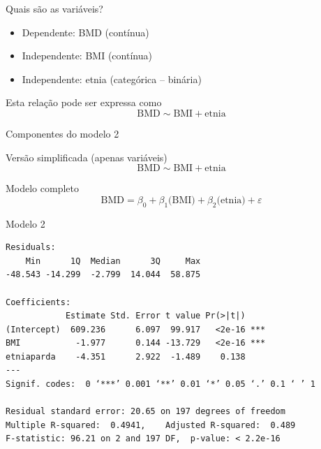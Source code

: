 \documentclass{beamer}
\begin{document}
\begin{frame}{\scriptsize Quais são as variáveis?}
  \begin{itemize}
    \footnotesize
  \item Dependente: BMD (contínua)
  \item Independente: BMI (contínua)
  \item Independente: etnia (categórica -- binária)
  \end{itemize}
  \vfill
  \begin{block}{Esta relação pode ser expressa como}
    \footnotesize
    \begin{displaymath}
      \text{BMD} \sim \text{BMI} + \text{etnia}
    \end{displaymath}
  \end{block}
\end{frame}

\begin{frame}{\scriptsize Componentes do modelo 2}
  \begin{block}{\footnotesize Versão simplificada (apenas variáveis)}
    \footnotesize
    \begin{displaymath}
      \text{BMD} \sim \text{BMI} + \text{etnia}
    \end{displaymath}
  \end{block}
  \bigskip
  \bigskip
  \begin{block}{Modelo completo}
    \begin{displaymath}
      \text{BMD} =\beta_0 + \beta_1 \text{(BMI)} + \beta_2 \text{(etnia)} +\varepsilon
    \end{displaymath}
  \end{block}
  \vfill
\end{frame}

\begin{frame}[fragile]{\scriptsize }
  \begin{center}
    \begin{exampleblock}{Modelo 2}
      \tiny
\begin{verbatim}
Residuals:
    Min      1Q  Median      3Q     Max 
-48.543 -14.299  -2.799  14.044  58.875 

Coefficients:
            Estimate Std. Error t value Pr(>|t|)    
(Intercept)  609.236      6.097  99.917   <2e-16 ***
BMI           -1.977      0.144 -13.729   <2e-16 ***
etniaparda    -4.351      2.922  -1.489    0.138    
---
Signif. codes:  0 ‘***’ 0.001 ‘**’ 0.01 ‘*’ 0.05 ‘.’ 0.1 ‘ ’ 1

Residual standard error: 20.65 on 197 degrees of freedom
Multiple R-squared:  0.4941,	Adjusted R-squared:  0.489 
F-statistic: 96.21 on 2 and 197 DF,  p-value: < 2.2e-16
\end{verbatim}
    \end{exampleblock}
  \end{center}
\end{frame}
\end{document}
